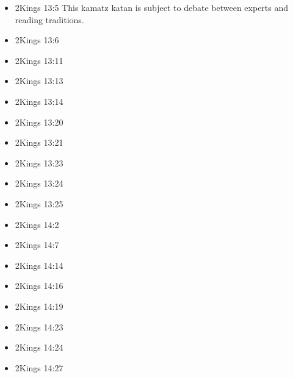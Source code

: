 \documentclass[14pt]{book}
\begin{document}
\begin{multicols}{2}
\begin{itemize}
													\item 2Kings 13:5 This kamatz katan is subject to debate between experts and reading traditions.
													
													\item 2Kings 13:6
													
													\item 2Kings 13:11
													
													\item 2Kings 13:13
													
													\item 2Kings 13:14
													
													\item 2Kings 13:20
													
													\item 2Kings 13:21
													
													\item 2Kings 13:23
													
													\item 2Kings 13:24
													
													\item 2Kings 13:25
													
													\item 2Kings 14:2
													
													\item 2Kings 14:7
													
													\item 2Kings 14:14
													
													\item 2Kings 14:16
													
													\item 2Kings 14:19
													
													\item 2Kings 14:23
													
													\item 2Kings 14:24
													
													\item 2Kings 14:27
													

\end{itemize}
\end{multicols}
\end{document}
